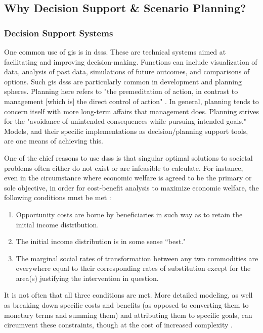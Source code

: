 \subsection{Why Decision Support \& Scenario Planning?} \label{sec:scenario}

\subsubsection{Decision Support Systems}

One common use of \ac{gis} is in \acp{dss}. These are technical systems aimed at facilitating and improving decision-making. Functions can include visualization of data, analysis of past data, simulations of future outcomes, and comparisons of options. Such \ac{gis} \acp{dss} are particularly common in development and planning spheres. Planning here refers to "the premeditation of action, in contrast to management [which is] the direct control of action" \cite{harrisLocationalModelsGeographic1993}. In general, planning tends to concern itself with more long-term affairs that management does. Planning strives for the "avoidance of unintended consequences while pursuing intended goals." Models, and their specific implementations as decision/planning support tools, are one means of achieving this. 

One of the chief reasons to use \acp{dss} is that singular optimal solutions to societal problems often either do not exist or are infeasible to calculate. For instance, even in the circumstance where economic welfare is agreed to be the primary or sole objective, in order for cost-benefit analysis to maximize economic welfare, the following conditions must be met \cite{krutillaWelfareAspectsBenefitCost1961}:

\begin{enumerate}[itemsep=0pt,parsep=0pt]
	\item{Opportunity costs are borne by beneficiaries in such way as to retain the initial income distribution.}
	\item{The initial income distribution is in some sense ``best."}
	\item{The marginal social rates of transformation between any two commodities are everywhere equal to their corresponding rates of substitution except for the area(s) justifying the intervention in question.}
\end{enumerate}

It is not often that all three conditions are met. More detailed modeling, as well as breaking down specific costs and benefits (as opposed to converting them to monetary terms and summing them) and attributing them to specific goals, can circumvent these constraints, though at the cost of increased complexity \cite{hillGoalsAchievementMatrixEvaluating1972}.

